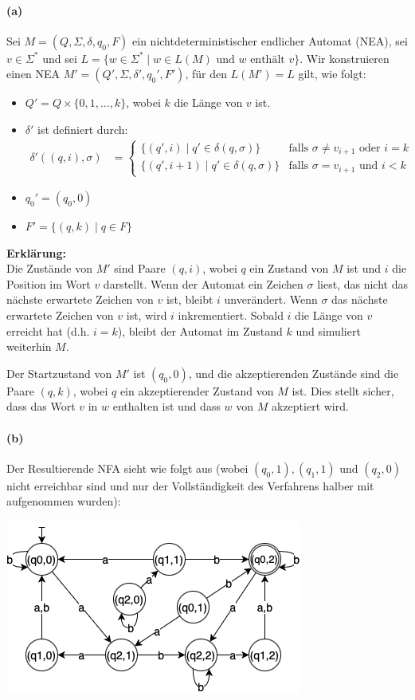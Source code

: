 
\paragraph{(a)}
	Sei $M = (Q, \Sigma, \delta, q_0, F)$ ein nichtdeterministischer endlicher Automat (NEA), sei $v \in \Sigma^*$ und sei $L = \{ w \in \Sigma^* \mid w \in L(M) \text{ und } w \text{ enthält } v \}$. Wir konstruieren einen NEA $M' = (Q', \Sigma, \delta', q_0', F')$, für den $L(M') = L$ gilt, wie folgt:

	\begin{itemize}
		\item $Q' = Q \times \{0, 1, \ldots, k\}$, wobei $k$ die Länge von $v$ ist.
		\item $\delta'$ ist definiert durch:
		\begin{align*}
			\delta'((q, i), \sigma) &= \begin{cases}
				\{ (q', i) \mid q' \in \delta(q, \sigma) \} & \text{falls } \sigma \neq v_{i+1}\text{ oder } i = k \\
				\{ (q', i+1) \mid q' \in \delta(q, \sigma) \} & \text{falls } \sigma = v_{i+1} \text{ und } i < k
			\end{cases}
		\end{align*}
		\item $q_0' = (q_0, 0)$
		\item $F' = \{ (q, k) \mid q \in F \}$
	\end{itemize}

	\textbf{Erklärung:}\\
	Die Zustände von $M'$ sind Paare $(q, i)$, wobei $q$ ein Zustand von $M$ ist und $i$ die Position im Wort $v$ darstellt. Wenn der Automat ein Zeichen $\sigma$ liest, das nicht das nächste erwartete Zeichen von $v$ ist, bleibt $i$ unverändert. Wenn $\sigma$ das nächste erwartete Zeichen von $v$ ist, wird $i$ inkrementiert. Sobald $i$ die Länge von $v$ erreicht hat (d.h. $i = k$), bleibt der Automat im Zustand $k$ und simuliert weiterhin $M$.

	Der Startzustand von $M'$ ist $(q_0, 0)$, und die akzeptierenden Zustände sind die Paare $(q, k)$, wobei $q$ ein akzeptierender Zustand von $M$ ist. Dies stellt sicher, dass das Wort $v$ in $w$ enthalten ist und dass $w$ von $M$ akzeptiert wird.
	
\paragraph{(b)}
	Der Resultierende NFA sieht wie folgt aus (wobei $(q_0,1), (q_1,1)$ und $(q_2,0)$ nicht erreichbar sind und nur der Vollständigkeit des Verfahrens halber mit aufgenommen wurden):

	\includegraphics[scale=0.75]{NEA-Konstruktion}  
	


\newpage